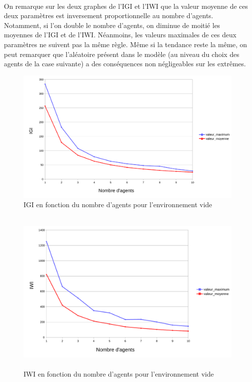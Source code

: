\documentclass{article}
\begin{document}
            \paragraph{} On remarque sur les deux graphes de l'IGI et l'IWI que la valeur moyenne de ces deux paramètres est inversement proportionnelle au nombre d'agents.
            Notamment, si l'on double le nombre d'agents, on diminue de moitié les moyennes de l'IGI et de l'IWI. Néanmoins, les valeurs maximales de ces deux paramètres ne suivent pas la même règle.
            Même si la tendance reste la même, on peut remarquer que l'aléatoire présent dans le modèle (au niveau du choix des agents de la case suivante) a des conséquences non négligeables sur les
            extrêmes.
            \begin{figure}[!h]
                \begin{center}
                    \includegraphics[height = 8.1 cm]{graphes pdf/variance tortues IGI.pdf}
                    \caption{IGI en fonction du nombre d'agents pour l'environnement vide}
                \end{center}
            \end{figure}
            \begin{figure}[!h]
                \begin{center}
                    \includegraphics[height = 8.1cm]{graphes pdf/variance tortues IWI.pdf}
                    \caption{IWI en fonction du nombre d'agents pour l'environnement vide}
                \end{center}
            \end{figure}
            \newpage
\end{document}
